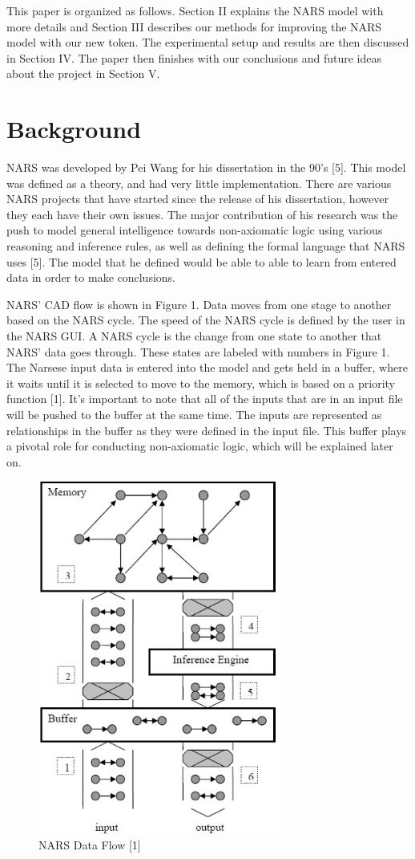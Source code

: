 \documentclass[conference]{IEEEtran}
\begin{document}
	This paper is organized as follows. Section II explains the NARS model with more details and Section III describes our methods for improving the NARS model with our new token. The experimental setup and results are then discussed in Section IV. The paper then finishes with our conclusions and future ideas about the project in Section V.
	
	
\section{Background}
	NARS was developed by Pei Wang for his dissertation in the 90's [5]. This model was defined as a theory, and had very little implementation. There are various NARS projects that have started since the release of his dissertation, however they each have their own issues. The major contribution of his research was the push to model general intelligence towards non-axiomatic logic using various reasoning and inference rules, as well as defining the formal language that NARS uses [5]. The model that he defined would be able to able to learn from entered data in order to make conclusions.

	NARS' CAD flow is shown in Figure 1. Data moves from one stage to another based on the NARS cycle. The speed of the NARS cycle is defined by the user in the NARS GUI. A NARS cycle is the change from one state to another that NARS' data goes through. These states are labeled with numbers in Figure 1. The Narsese input data is entered into the model and gets held in a buffer, where it waits until it is selected to move to the memory, which is based on a priority function [1]. It's important to note that all of the inputs that are in an input file will be pushed to the buffer at the same time. The inputs are represented as relationships in the buffer as they were defined in the input file. This buffer plays a pivotal role for conducting non-axiomatic logic, which will be explained later on.

	 \begin{figure}[ht!]
\centering
\includegraphics[width=80mm]{Picture1.png}
\caption{NARS Data Flow [1] \label{overflow}}
\end{figure}
	
\end{document}
